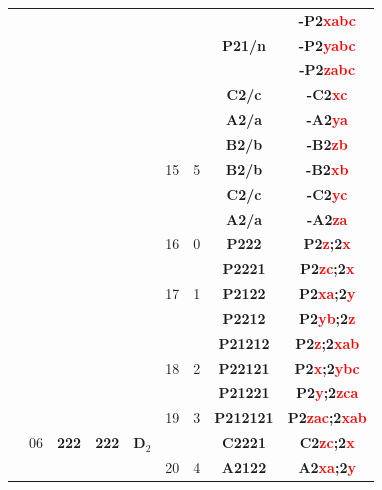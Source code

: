 \documentclass{article}      %
\begin{document}
\begin{small}
\begin{longtable}[c]{|c|c|c|c|c|c|c|c|c|}
 & & & & & & & &\textbf{-P2\textcolor{red}{xabc}}  \\\cline{9-9}
 & & & & & & &\textbf{P21/n} &\textbf{-P2\textcolor{red}{yabc}}  \\\cline{9-9}
 & & & & & & & &\textbf{-P2\textcolor{red}{zabc}}  \\\cline{6-9}
 & & & & & & &\textbf{C2/c} &\textbf{-C2\textcolor{red}{xc}}  \\\cline{8-9}
 & & & & & & &\textbf{A2/a} &\textbf{-A2\textcolor{red}{ya}}  \\\cline{8-9}
 & & & & & & &\textbf{B2/b} &\textbf{-B2\textcolor{red}{zb}}  \\\cline{8-9}
 & & & & &\textrm{15} &5 &\textbf{B2/b} &\textbf{-B2\textcolor{red}{xb}}  \\\cline{8-9}
 & & & & & & &\textbf{C2/c} &\textbf{-C2\textcolor{red}{yc}}  \\\cline{8-9}
 & & & & & & &\textbf{A2/a} &\textbf{-A2\textcolor{red}{za}}  \\\hline
 & & & & &\textrm{16} &0 &\textbf{P222} &\textbf{P2\textcolor{red}{z};2\textcolor{red}{x}}  \\\cline{6-9}
 & & & & & & &\textbf{P2221} &\textbf{P2\textcolor{red}{zc};2\textcolor{red}{x}}  \\\cline{8-9}
 & & & & &\textrm{17} &1 &\textbf{P2122} &\textbf{P2\textcolor{red}{xa};2\textcolor{red}{y}}  \\\cline{8-9}
 & & & & & & &\textbf{P2212} &\textbf{P2\textcolor{red}{yb};2\textcolor{red}{z}}  \\\cline{6-9}
 & & & & & & &\textbf{P21212} &\textbf{P2\textcolor{red}{z};2\textcolor{red}{xab}}  \\\cline{8-9}
 & & & & &\textrm{18} &2 &\textbf{P22121} &\textbf{P2\textcolor{red}{x};2\textcolor{red}{ybc}}  \\\cline{8-9}
 & & & & & & &\textbf{P21221} &\textbf{P2\textcolor{red}{y};2\textcolor{red}{zca}}  \\\cline{6-9}
 & & & & &\textrm{19} &3 &\textbf{P212121} &\textbf{P2\textcolor{red}{zac};2\textcolor{red}{xab}}  \\\cline{6-9}
 & \textrm{06} & \textbf{222} & \textbf{222} & $\mathbf{D}_2$ & & &\textbf{C2221} &\textbf{C2\textcolor{red}{zc};2\textcolor{red}{x}}  \\\cline{8-9}
 & & & & &\textrm{20} &4 &\textbf{A2122} &\textbf{A2\textcolor{red}{xa};2\textcolor{red}{y}}  \\\cline{8-9}

\end{longtable}
\end{small}
\end{document}
